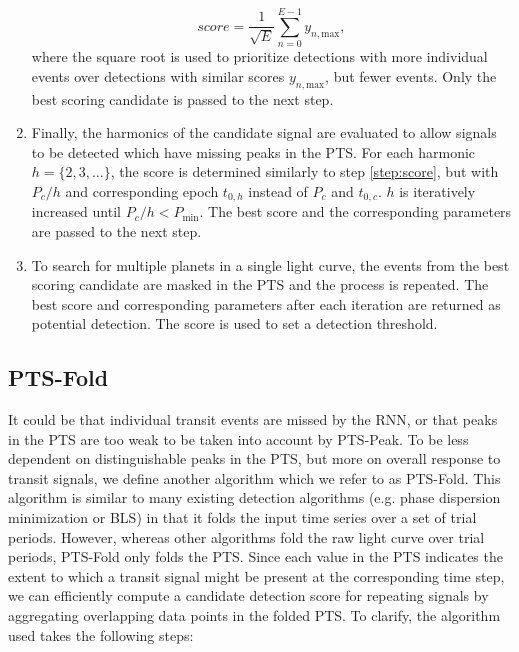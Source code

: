 \begin{enumerate}
    \begin{equation}
        score = \frac{1}{\sqrt{E}}\sum_{n=0}^{E-1} y_{n,\text{max}},
    \end{equation}
    where the square root is used to prioritize detections with more individual events over detections with similar scores $y_{n,\text{max}}$, but fewer events. Only the best scoring candidate is passed to the next step.
    \item\label{step:harmonics}  Finally, the harmonics of the candidate signal are evaluated to allow signals to be detected which have missing peaks in the PTS. For each harmonic $h=\{2,3,\dots\}$, the score is determined similarly to step \ref{step:score}, but with $P_c/h$ and corresponding epoch $t_{0,h}$ instead of $P_c$ and $t_{0,c}$. $h$ is iteratively increased until $P_c/h < P_{\text{min}}$.  The best score and the corresponding parameters are passed to the next step.
    \item To search for multiple planets in a single light curve, the events from the best scoring candidate are masked in the PTS and the process is repeated. The best score and corresponding parameters after each iteration are returned as potential detection. The score is used to set a detection threshold.
    
    
\end{enumerate}
 
\subsection{PTS-Fold}
\label{sec:pts-fold}

It could be that individual transit events are missed by the RNN, or that peaks in the PTS are too weak to be taken into account by PTS-Peak. To be less dependent on distinguishable peaks in the PTS, but more on overall response to transit signals, we define another algorithm which we refer to as PTS-Fold. This algorithm is similar to many existing detection algorithms (e.g. phase dispersion minimization or BLS) in that it folds the input time series over a set of trial periods. However, whereas other algorithms fold the raw light curve over trial periods, PTS-Fold only folds the PTS. Since each value in the PTS indicates the extent to which a transit signal might be present at the corresponding time step, we can efficiently compute a candidate detection score for repeating signals by aggregating overlapping data points in the folded PTS. To clarify, the algorithm used takes the following steps:

